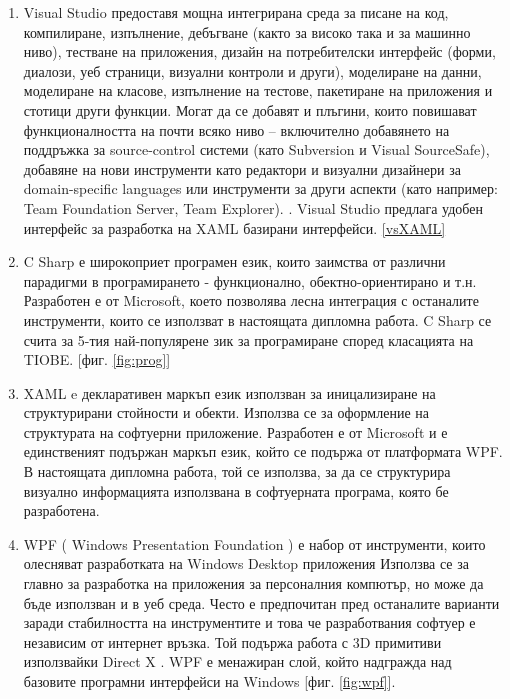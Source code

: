 \begin{enumerate}
    \item Visual Studio предоставя мощна интегрирана среда за писане на код, компилиране, изпълнение, дебъгване (както за високо така и за машинно ниво), тестване на приложения, дизайн на потребителски интерфейс (форми, диалози, уеб страници, визуални контроли и други), моделиране на данни, моделиране на класове, изпълнение на тестове, пакетиране на приложения и стотици други функции. Могат да се добавят и плъгини, които повишават функционалността на почти всяко ниво – включително добавянето на поддръжка за source-control системи (като Subversion и Visual SourceSafe), добавяне на нови инструменти като редактори и визуални дизайнери за domain-specific languages или инструменти за други аспекти (като например: Team Foundation Server, Team Explorer). \cite{vs}. Visual Studio предлага удобен интерфейс за разработка на XAML базирани интерфейси. \ref{vsXAML}
    
    \item C Sharp е широкоприет програмен език, които заимства от различни парадигми в програмирането - функционално, обектно-ориентирано и т.н. Разработен е от Microsoft, което позволява лесна интеграция с останалите инструменти, които се използват в настоящата дипломна работа. C Sharp се счита за 5-тия най-популярене зик за програмиране според класацията на TIOBE. [фиг. \ref{fig:prog}]
    
    \item XAML e декларативен маркъп език използван за иницализиране на структурирани стойности и обекти. Използва се за оформление на структурата на софтуерни приложение. Разработен е от Microsoft и е единственият подържан маркъп език, който се подържа от платформата WPF. В настоящата дипломна работа, той се използва, за да се структурира визуално информацията използвана в софтуерната програма, която бе разработена.
    
    \item WPF ( Windows Presentation Foundation ) \cite{wpf} е набор от инструменти, които олесняват разработката на Windows Desktop приложения Използва се за главно за разработка на приложения за персоналния компютър, но може да бъде използван и в уеб среда. Често е предпочитан пред останалите варианти заради стабилността на инструментите и това че разработвания софтуер е независим от интернет връзка. Той подържа работа с 3D примитиви използвайки Direct X \cite{wpfUsage}. WPF е менажиран слой, който надгражда над базовите програмни интерфейси на Windows [фиг. \ref{fig:wpf}].
    

\end{enumerate}
